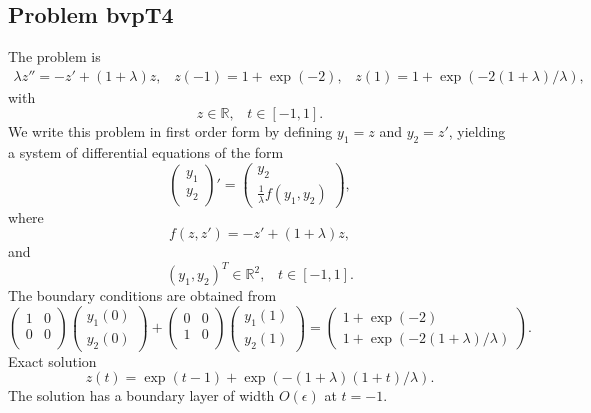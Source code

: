 \documentclass[<options>]{article}
\def \RR {{\mathbb{R}}}
\begin{document}
\subsection{Problem bvpT4}\label{test4}
The problem is
\begin{eqnarray*}
\lambda z'' = - z' + (1 +\lambda) z, \;\;\; z(-1) = 1 + \exp(-2), \;\;\; z(1) = 1 + \exp(-2(1+\lambda)/\lambda),
\end{eqnarray*}
with
\[
z \in \RR, \;\;\; t\in [-1,1].
\]
We write this problem in first order form by defining $y_1=z$ and $y_2=z'$, yielding a system of differential equations of the form
\begin{equation*}
\left(\begin{array}{c}
y_1\\
y_2
\end{array}\right)'=
\left(\begin{array}{c}
y_2\\
\frac{1}{\lambda}f(y_1,y_2)
\end{array}\right),
\end{equation*}
where
\begin{equation*}
f(z,z') = -z' + (1 +\lambda) z,
\end{equation*}
and
\[
(y_1,y_2)^T \in \RR^{2}, \;\;\;  t \in [-1,1].
\]
The  boundary conditions are obtained from
\begin{equation*}
\left(
  \begin{array}{cc}
    1 & 0 \\
    0 & 0 \\
  \end{array}
\right)
\left(\begin{array}{c}
y_{1}(0)\\
y_{2}(0)
\end{array}\right)
+
\left(
  \begin{array}{cc}
    0 & 0 \\
    1 & 0 \\
  \end{array}
\right)
\left(\begin{array}{c}
y_{1}(1)\\
y_{2}(1)
\end{array}\right)=\left(\begin{array}{c}
1 + \exp(-2) \\
1 + \exp(-2(1+\lambda)/\lambda)
\end{array}\right).
\end{equation*}
\textrm{Exact solution}
$$z(t) = \exp(t -1) + \exp(-(1 +\lambda)(1 +t) /\lambda).$$
The solution has a boundary layer of width $O(\epsilon)$  at $t = -1.$
\end{document}
